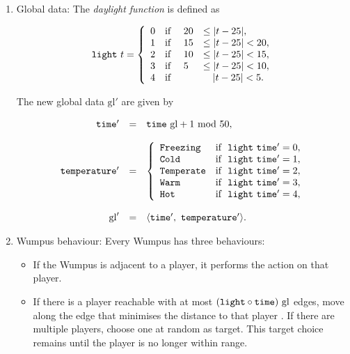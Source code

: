 \begin{definition}
\begin{enumerate}
	\item {\upshape Global data:} The {\em daylight function} is defined as
	
	$$
			\mathtt{light}\ t = 
			\left\{
				\begin{array}{l l l l}
					0 & \textnormal{if } & 20 & \leq |t - 25|,\\
					1 & \textnormal{if } & 15 & \leq |t - 25| < 20,\\
					2 & \textnormal{if } & 10 & \leq |t - 25| < 15,\\
					3 & \textnormal{if } & 5 & \leq |t - 25| < 10,\\
					4 & \textnormal{if } & & \ \ \ |t - 25| < 5.
				\end{array}
			\right.
	$$
	
	The new global data $\mathrm{gl}'$ are given by
	
	$$
		\begin{array}{r c l}
		   \field{time'} & = &  \field{time}\ \mathrm{gl} + 1\ \mathrm{mod}\ 50,\\
		   \\
			\field{temperature'} & = &
			\left\{
				\begin{array}{l l}
					\type{Freezing} & \mt{if }\ \field{light}\ \field{time'} = 0,\\
					\type{Cold} & \mt{if }\ \field{light}\ \field{time'} = 1,\\
					\type{Temperate} & \mt{if }\ \field{light}\ \field{time'} = 2,\\
					\type{Warm} & \mt{if }\ \field{light}\ \field{time'} = 3,\\
					\type{Hot} & \mt{if }\ \field{light}\ \field{time'} = 4,
				\end{array}
			\right.\\
			\\
			\mathrm{gl}' & = & \langle \field{time'},\ \field{temperature'} \rangle.\\
		\end{array}
	$$
	
	\item {\upshape Wumpus behaviour:} Every Wumpus has three behaviours:
	
	\begin{itemize}
		\item If the Wumpus is adjacent to a player, it performs the  action on that player.
		
		\item If there is a player reachable with at most $(\field{light} \circ \field{time})\ \mathrm{gl}$ edges, move along the edge that minimises the distance to that player . If there are multiple players, choose one at random as target. This target choice remains until the player is no longer within range.
		

\end{itemize}
\end{enumerate}
\end{definition}
